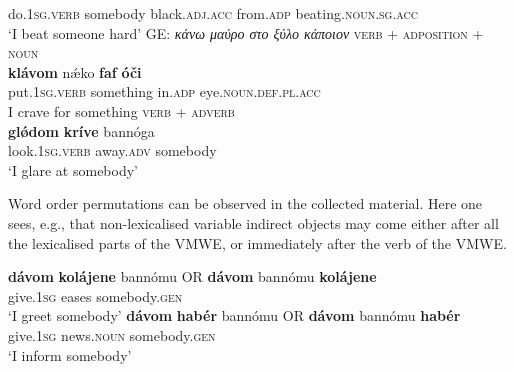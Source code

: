 \documentclass[output=paper,colorlinks,citecolor=brown]{langscibook}
\begin{document}
{do}.\textsc{1sg.verb} somebody black.\textsc{adj.acc} from.\textsc{adp} beating.\textsc{noun.sg.acc}\\
\glt `I beat someone hard' GE: \textit{κάνω μαύρο στο ξύλο κάποιον}
\ex
\textsc{verb}  + \textsc{adposition} + \textsc{noun}\\
\gll \textbf{{klávom}}  nǽko \textbf{{faf}} \textbf{{óči}} \\
{put}.\textsc{1sg.verb} something in.\textsc{adp} eye.\textsc{noun.def.pl.acc}\\
\glt I crave for something
\ex
\label{ex:glare}
\textsc{verb} + \textsc{adverb} \\
\gll \textbf{{glǿdom}} \textbf{{kríve}}  bannóga\\
{look}.\textsc{1sg.verb} {away}.\textsc{adv}  somebody\\
\glt `I glare at somebody'
\z

Word order permutations can be observed in the collected material. Here one sees, e.g., that non-lexicalised variable indirect objects may come either after all the lexicalised parts of the VMWE, or immediately after the verb of the VMWE.

 \ea \label{ex:lvcwordorder}
 \begin{xlist}
\ex 
\gll \textbf{{dávom}} \textbf{{kolájene}} bannómu OR \textbf{{dávom}} bannómu \textbf{{kolájene }}\\
{give}.\textsc{1sg}  eases somebody.\textsc{gen}\\
\glt `I greet somebody'
\ex
\gll \textbf{{dávom}} \textbf{{habér}}  bannómu OR \textbf{{dávom}} bannómu \textbf{{habér}}\\
{give}.\textsc{1sg} news.\textsc{noun} somebody.\textsc{gen}\\
\glt `I inform somebody' 
\end{xlist}
\z
\end{document}
